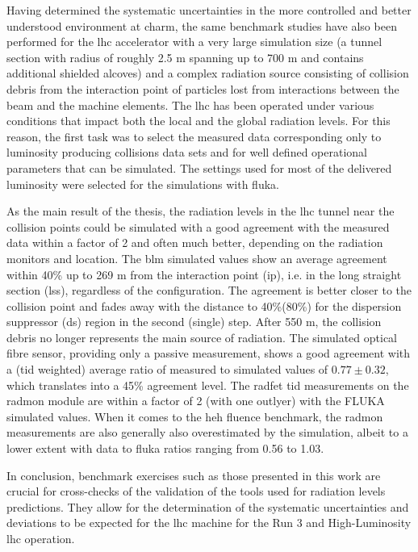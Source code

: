 \documentclass[encoding=utf8,british]{tumphthesis}
\begin{document}
Having determined the systematic uncertainties in the more controlled and better understood environment at \acrshort{charm}, the same benchmark studies have also been performed for the \acrshort{lhc} accelerator with a very large simulation size (a tunnel section with radius of roughly 2.5 m spanning up to 700 m and contains additional shielded alcoves) and a complex radiation source consisting of collision debris from the interaction point of particles lost from interactions between the beam and the machine elements. The \acrshort{lhc} has been operated under various conditions that impact both the local and the global radiation levels. For this reason, the first task was to select the measured data corresponding only to luminosity producing collisions data sets and for well defined operational parameters that can be simulated. The settings used for most of the delivered luminosity were selected for the simulations with \acrshort{fluka}.

As the main result of the thesis, the radiation levels in the \acrshort{lhc} tunnel near the collision points could be simulated with a good agreement with the measured data within a factor of 2 and often much better, depending on the radiation monitors and location. The \acrshort{blm} simulated values show an average agreement within 40\% up to 269 m from the interaction point (\acrshort{ip}), i.e. in the long straight section (\acrshort{lss}), regardless of the configuration. The agreement is better closer to the collision point and fades away with the distance to 40\%(80\%) for the dispersion suppressor (\acrshort{ds}) region in the second (single) step. After 550 m, the collision debris no longer represents the main source of radiation. The simulated optical fibre sensor, providing only a passive measurement, shows a good agreement with a (\acrshort{tid} weighted) average ratio of measured to simulated values of $0.77\pm0.32$, which translates into a 45\% agreement level. The \acrshort{radfet} \acrshort{tid} measurements on the \acrshort{radmon} module are within a factor of 2 (with one outlyer) with the FLUKA simulated values. When it comes to the \acrshort{heh} fluence benchmark, the \acrshort{radmon} measurements are also generally also overestimated by the simulation, albeit to a lower extent with data to \acrshort{fluka} ratios ranging from 0.56 to 1.03.

In conclusion, benchmark exercises such as those presented in this work are crucial for cross-checks of the validation of the tools used for radiation levels predictions. They allow for the determination of the systematic uncertainties and deviations to be expected for the \acrshort{lhc} machine for the Run 3 and High-Luminosity \acrshort{lhc} operation.
\end{document}
